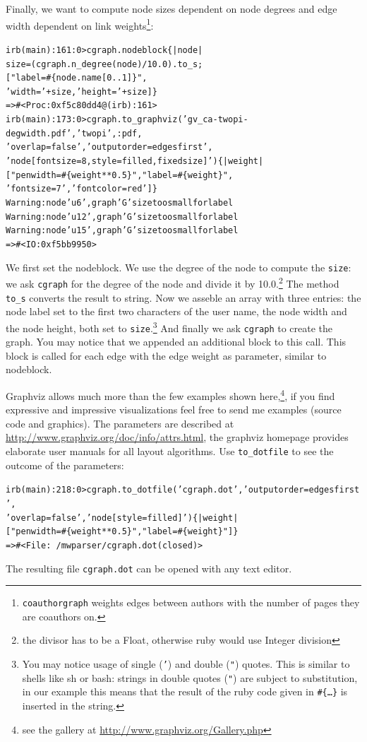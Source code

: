 \documentclass[a4paper]{scrartcl}
\newcounter{tcounter}
\newcommand{\tcount}{\makebox[0pt][r]{\tiny\thetcounter~}}
\newenvironment{typed}{\refstepcounter{tcounter}\bgroup\setlength{\topsep}{0pt}\renewcommand{\FrameCommand}[1]{\fcolorbox{black!30}{bgcolor}{##1}\tcount}\MakeFramed{\FrameRestore}\begin{alltt}\small}{\end{alltt}\endMakeFramed\egroup\par\aftergroup\noindent\aftergroup\ignorespaces}
\newcommand{\file}[1]{\texttt{\color{file}#1}}
\newcommand{\cmd}[1]{\texttt{\color{cmd}#1}}
\newcommand{\p}{\textcolor{prompt}}
\renewcommand{\c}{\textcolor{cmd}}
\begin{document}
Finally, we want to compute node sizes dependent on node degrees and
edge width dependent on link weights\footnote{\cmd{coauthorgraph}
  weights edges between authors with the number of pages they are
  coauthors on.}:
\begin{typed}
\p{irb(main):161:0>} \c{cgraph.nodeblock \{ |node| 
                                    size = (cgraph.n_degree(node)/10.0).to_s; 
                                    ["label=#\{node.name[0..1]\}", 
                                     'width=' + size, 'height=' + size] \}}
=> #<Proc:0xf5c80dd4@(irb):161>
\p{irb(main):173:0>} \c{cgraph.to_graphviz('gv_ca-twopi-degwidth.pdf', 'twopi', :pdf, 
                     'overlap=false', 'outputorder=edgesfirst',
                     'node [fontsize=8, style=filled, fixedsize]') \{ |weight| 
                        ["penwidth=#\{weight**0.5\}", "label=#\{weight\}", 
                         'fontsize=7', 'fontcolor=red' ] \}}
Warning: node 'u6', graph 'G' size too small for label
Warning: node 'u12', graph 'G' size too small for label
Warning: node 'u15', graph 'G' size too small for label
=> #<IO:0xf5bb9950>
\end{typed}
We first set the nodeblock. We use the degree of the node to compute
the \cmd{size}: we ask \cmd{cgraph} for the degree of the node and
divide it by 10.0.\footnote{the divisor has to be a Float, otherwise
  ruby would use Integer division} The method \cmd{to\_s} converts the
result to string. Now we asseble an array with three entries: the node
label set to the first two characters of the user name, the node width
and the node height, both set to \cmd{size}.\footnote{You may notice
  usage of single (\cmd{'}) and double (\cmd{"}) quotes. This is
  similar to shells like sh or bash: strings in double quotes
  (\cmd{"}) are subject to substitution, in our example this means
  that the result of the ruby code given in \cmd{\#\{\dots\}} is
  inserted in the string.}  And finally we ask \cmd{cgraph} to create
the graph. You may notice that we appended an additional block to this
call. This block is called for each edge with the edge weight as
parameter, similar to nodeblock.

Graphviz allows much more than the few examples shown
here,\footnote{see the gallery at
  \url{http://www.graphviz.org/Gallery.php}}, if you find expressive
and impressive visualizations feel free to send me examples (source
code and graphics). The parameters are described at
\url{http://www.graphviz.org/doc/info/attrs.html}, the graphviz
homepage provides elaborate user manuals for all layout
algorithms. Use \cmd{to\_dotfile} to see the outcome of the parameters:
\begin{typed}
\p{irb(main):218:0>} \c{cgraph.to_dotfile('cgraph.dot', 'outputorder=edgesfirst',
                     'overlap=false', 'node [style=filled]')  \{ |weight| 
                            ["penwidth=#\{weight**0.5\}", "label=#\{weight\}"] \}}
=> #<File:~/mwparser/cgraph.dot (closed)>
\end{typed}
The resulting file \file{cgraph.dot} can be opened with any text editor.
\end{document}
